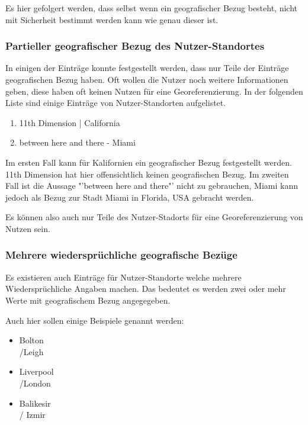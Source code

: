 					Es hier gefolgert werden, dass selbst wenn ein geografischer Bezug besteht, nicht mit Sicherheit bestimmt werden kann wie genau dieser ist.

				\subsubsection{Partieller geografischer Bezug des Nutzer-Standortes}

					In einigen der Einträge konnte festgestellt werden, dass nur Teile der Einträge geografischen Bezug haben. 
					Oft wollen die Nutzer noch weitere Informationen geben, diese haben oft keinen Nutzen für eine Georeferenzierung. 
					In der folgenden Liste sind einige Einträge von Nutzer-Standorten aufgelistet. 

					\begin{enumerate}
						\item 11th Dimension | California
						\item between here and there - Miami
					\end{enumerate}

					Im ersten Fall kann für Kalifornien ein geografischer Bezug festgestellt werden.
					11th Dimension hat hier offensichtlich keinen geografischen Bezug.
					Im zweiten Fall ist die Aussage "'between here and there"' nicht zu gebrauchen, Miami kann jedoch als Bezug zur Stadt Miami in Florida, USA gebracht werden.
					
					Es können also auch nur Teile des Nutzer-Stadorts für eine Georeferenzierung von Nutzen sein.


				\subsubsection{Mehrere wiedersprüchliche geografische Bezüge} 

					Es existieren auch Einträge für Nutzer-Standorte welche mehrere Wiedersprüchliche Angaben machen.
					Das bedeutet es werden zwei oder mehr Werte mit geografischem Bezug angegegeben.

					Auch hier sollen einige Beispiele genannt werden:

					\begin{itemize}
						\item Bolton\\/Leigh
						\item Liverpool\\/London
						\item  Balikesir \\/ Izmir	
					\end{itemize}							
						
